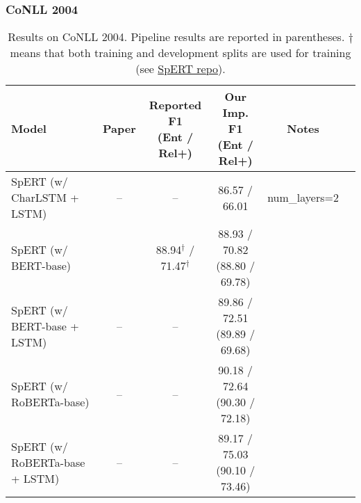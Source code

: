 \documentclass{article}
\begin{document}
\subsubsection{CoNLL 2004}
\begin{table}[H]
    \centering
    \begin{tabular}{lccccc}
    \toprule
    Model & Paper & \makecell{Reported F1 \\(Ent / Rel+)} & \makecell{Our Imp. F1 \\(Ent / Rel+)} & Notes \\
    \midrule
    SpERT (w/ CharLSTM + LSTM)     & --                     & --               & 86.57 / 66.01 & num\_layers=2 \\
    SpERT (w/ BERT-base)           & \citet{eberts2019span} & 88.94$^\dagger$ / 71.47$^\dagger$ & \makecell{88.93 / 70.82 \\(88.80 / 69.78)} \\
    SpERT (w/ BERT-base + LSTM)    & --                     & --               & \makecell{89.86 / 72.51 \\(89.89 / 69.68)} \\ 
    SpERT (w/ RoBERTa-base)        & --                     & --               & \makecell{90.18 / 72.64 \\(90.30 / 72.18)} \\ 
    SpERT (w/ RoBERTa-base + LSTM) & --                     & --               & \makecell{89.17 / 75.03 \\(90.10 / 73.46)} \\ 
    \bottomrule
    \end{tabular}
    \caption{Results on CoNLL 2004. Pipeline results are reported in parentheses. $\dagger$ means that both training and development splits are used for training (see \href{https://github.com/lavis-nlp/spert/issues/2}{SpERT repo}).}
\end{table}
\end{document}
